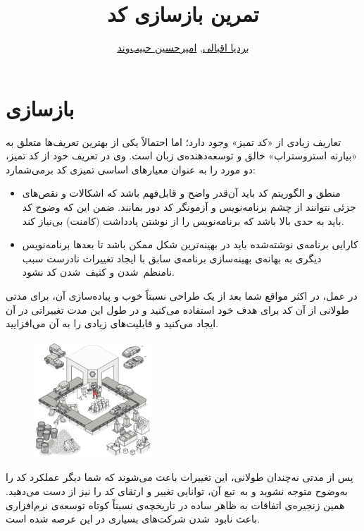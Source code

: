 \documentclass{utap}
\title{تمرین  بازسازی کد}
\author{
    \href{mailto:bardia.eghbali@gmail.com?subject=[AP\%20S98\%20Refactoring]\%20}{بردیا اقبالی},
    \href{mailto:ahhabibvand@gmail.com?subject=[AP\%20S98\%20Refactoring]\%20}{امیرحسین حبیب‌وند}
}
\begin{document}
\maketitle

\section{بازسازی}
تعاریف زیادی از
«کد تمیز»
وجود دارد؛ اما احتمالاً یکی از بهترین تعریف‌ها متعلق به
«بیارنه استروستراپ»
خالق و توسعه‌دهنده‌ی زبان  است. وی در تعریف خود از کد تمیز، دو مورد را به عنوان معیار‌های اساسی تمیزی کد برمی‌شمارد:
\begin{itemize}
\item
منطق و الگوریتم کد باید آن‌قدر واضح و قابل‌فهم باشد که اشکالات و نقص‌های ﺟﺰﺋﯽ نتوانند از چشم برنامه‌نویس و آزمونگر کد دور بمانند. ضمن این که وضوح کد باید به حدی بالا باشد که برنامه‌نویس را از نوشتن یادداشت (کامنت) بی‌نیاز کند.

\item
کارایی
برنامه‌ی نوشته‌شده باید در بهینه‌ترین
شکل ممکن باشد تا بعدها برنامه‌نویس دیگری به بهانه‌ی بهینه‌سازی
برنامه‌ی سابق با ایجاد تغییرات نادرست سبب نامنظم~شدن و کثیف~شدن کد نشود.
\end{itemize}

در عمل، در اکثر مواقع شما بعد از یک طراحی نسبتاً خوب و پیاده‌سازی آن، برای مدتی طولانی از آن کد برای هدف خود استفاده می‌کنید و در طول این مدت تغییراتی در آن ایجاد می‌کنید و قابلیت‌های زیادی را به آن می‌افزایید.

\begin{figure}
    \centering
    \includegraphics[width=0.4\textwidth]{refactoring}
\end{figure}

پس از مدتی نه‌چندان طولانی، این تغییرات باعث می‌شوند که شما دیگر عملکرد کد را به‌وضوح متوجه نشوید و به~تبع آن، توانایی تغییر و ارتقای کد را نیز از دست می‌دهید. همین زنجیره‌ی اتفاقات به ظاهر ساده در تاریخچه‌ی نسبتاً کوتاه توسعه‌ی نرم‌افزاری باعث نابود~شدن شرکت‌های بسیاری در این عرصه شده است.
\end{document}
